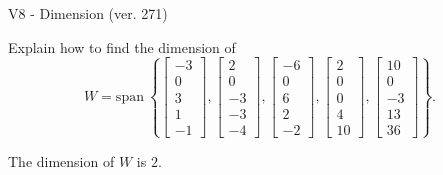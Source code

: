 \begin{exercise}
  \begin{exerciseTitle}V8 - Dimension (ver. 271)\end{exerciseTitle}
  \begin{exerciseStatement}
    Explain how to find the dimension of 
\[W=\mathrm{span}\ \left\{\left[\begin{array}{r}
-3 \\
0 \\
3 \\
1 \\
-1
\end{array}\right] , \left[\begin{array}{r}
2 \\
0 \\
-3 \\
-3 \\
-4
\end{array}\right] , \left[\begin{array}{r}
-6 \\
0 \\
6 \\
2 \\
-2
\end{array}\right] , \left[\begin{array}{r}
2 \\
0 \\
0 \\
4 \\
10
\end{array}\right] , \left[\begin{array}{r}
10 \\
0 \\
-3 \\
13 \\
36
\end{array}\right]\right\}.\]



  \end{exerciseStatement}
  \begin{exerciseAnswer}
   The dimension of \(W\) is  \(2\).
  


  \end{exerciseAnswer}
\end{exercise}